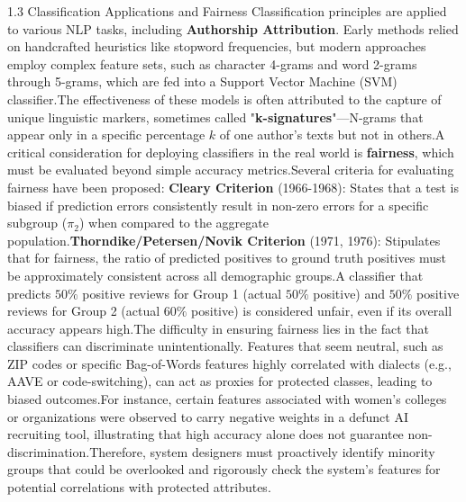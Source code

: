 \documentclass{article}
\begin{document}
1.3 Classification Applications and Fairness
Classification principles are applied to various NLP tasks, including \textbf{Authorship Attribution}. Early methods relied on handcrafted heuristics like stopword frequencies, but modern approaches employ complex feature sets, such as character 4-grams and word 2-grams through 5-grams, which are fed into a Support Vector Machine (SVM) classifier.\footnotemark[1] The effectiveness of these models is often attributed to the capture of unique linguistic markers, sometimes called "\textbf{k-signatures}"—N-grams that appear only in a specific percentage $k$ of one author’s texts but not in others.\footnotemark[1]
A critical consideration for deploying classifiers in the real world is \textbf{fairness}, which must be evaluated beyond simple accuracy metrics.\footnotemark[1] Several criteria for evaluating fairness have been proposed:
\textbf{Cleary Criterion} (1966-1968): States that a test is biased if prediction errors consistently result in non-zero errors for a specific subgroup ($\pi_2$) when compared to the aggregate population.\footnotemark[1]
\textbf{Thorndike/Petersen/Novik Criterion} (1971, 1976): Stipulates that for fairness, the ratio of predicted positives to ground truth positives must be approximately consistent across all demographic groups.\footnotemark[1] A classifier that predicts $50\%$ positive reviews for Group 1 (actual $50\%$ positive) and $50\%$ positive reviews for Group 2 (actual $60\%$ positive) is considered unfair, even if its overall accuracy appears high.\footnotemark[1]
The difficulty in ensuring fairness lies in the fact that classifiers can discriminate unintentionally. Features that seem neutral, such as ZIP codes or specific Bag-of-Words features highly correlated with dialects (e.g., AAVE or code-switching), can act as proxies for protected classes, leading to biased outcomes.\footnotemark[1] For instance, certain features associated with women’s colleges or organizations were observed to carry negative weights in a defunct AI recruiting tool, illustrating that high accuracy alone does not guarantee non-discrimination.\footnotemark[1] Therefore, system designers must proactively identify minority groups that could be overlooked and rigorously check the system's features for potential correlations with protected attributes.\footnotemark[1]
\end{document}
